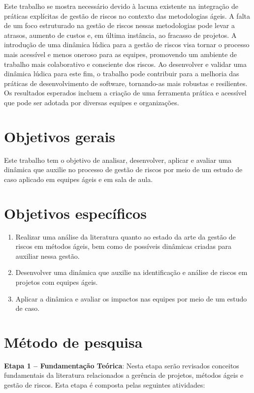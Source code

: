 \documentclass[
	12pt,
	openright,
	twoside,
	a4paper,
	english,
	brazil
	]{abntex2}
\begin{document}
Este trabalho se mostra necessário devido à lacuna existente na integração de práticas explícitas de gestão de riscos no contexto das metodologias ágeis. A falta de um foco estruturado na gestão de riscos nessas metodologias pode levar a atrasos, aumento de custos e, em última instância, ao fracasso de projetos. A introdução de uma dinâmica lúdica para a gestão de riscos visa tornar o processo mais acessível e menos oneroso para as equipes, promovendo um ambiente de trabalho mais colaborativo e consciente dos riscos. Ao desenvolver e validar uma dinâmica lúdica para este fim, o trabalho pode contribuir para a melhoria das práticas de desenvolvimento de software, tornando-as mais robustas e resilientes. Os resultados esperados incluem a criação de uma ferramenta prática e acessível que pode ser adotada por diversas equipes e organizações.

\section{Objetivos gerais}

Este trabalho tem o objetivo de analisar, desenvolver, aplicar e avaliar uma dinâmica que auxilie no processo de gestão de riscos por meio de um estudo de caso aplicado em equipes ágeis e em sala de aula.

\section{Objetivos específicos}

\begin{enumerate}
  \item Realizar uma análise da literatura quanto ao estado da arte da gestão de riscos em métodos ágeis, bem como de possíveis dinâmicas criadas para auxiliar nessa gestão.
  \item Desenvolver uma dinâmica que auxilie na identificação e análise de riscos em projetos com equipes ágeis.
  \item Aplicar a dinâmica e avaliar os impactos nas equipes por meio de um estudo de caso.
\end{enumerate}

\section{Método de pesquisa}

\textbf{Etapa 1 -- Fundamentação Teórica}: Nesta etapa serão revisados conceitos fundamentais da literatura relacionados a gerência de projetos, métodos ágeis e gestão de riscos. Esta etapa é composta pelas seguintes atividades:
\end{document}
